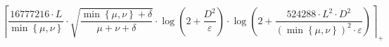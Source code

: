 \[\left\lceil \frac{16777216 \cdot L}{\min\left\{ \mu, \nu \right\}} \cdot \sqrt{\frac{\min\left\{ \mu, \nu \right\} + \delta}{\mu + \nu + \delta}} \cdot \log\left(2 + \frac{D^{2}}{\varepsilon}\right) \cdot \log\left(2 + \frac{524288 \cdot L^{2} \cdot D^{2}}{\left(\min\left\{ \mu, \nu \right\}\right)^{2} \cdot \varepsilon}\right) \right\rceil_{+}\]
